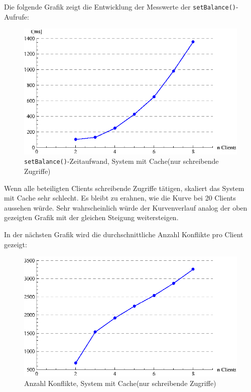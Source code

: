 Die folgende Grafik zeigt die Entwicklung der Messwerte der \texttt{set\-Balance()}-Aufrufe:
\begin{figure}[H]
\begin{center}
\includegraphics[width=\textwidth]{images_MessErgebnisse/incrementCacheSetBalance.eps}
\end{center}
\caption{\texttt{setBalance()}-Zeitaufwand, System mit Cache(nur schreibende Zugriffe)}
\end{figure}

Wenn alle beteiligten Clients schreibende Zugriffe tätigen, skaliert das System mit Cache sehr schlecht. Es bleibt zu erahnen, wie die Kurve bei 20 Clients aussehen würde. Sehr wahrscheinlich würde der Kurvenverlauf analog der oben gezeigten Grafik mit der gleichen Steigung weitersteigen.


In der nächsten Grafik wird die durchschnittliche Anzahl Konflikte pro Client gezeigt:
\begin{figure}[H]
\begin{center}
\includegraphics[width=\textwidth]{images_MessErgebnisse/incrementCacheKonfliktzahl.eps}
\end{center}
\caption{Anzahl Konflikte, System mit Cache(nur schreibende Zugriffe)}
\end{figure}

